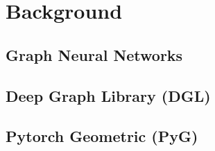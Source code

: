 \section{Background}
\subsection{Graph Neural Networks}

\subsection{Deep Graph Library (DGL)}

\subsection{Pytorch Geometric (PyG)}

